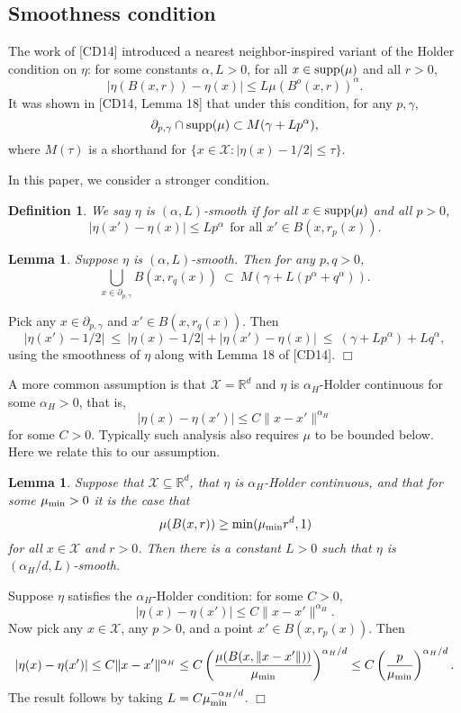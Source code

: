 \documentclass{article}
\def\R{{\mathbb{R}}}
\def\X{{\mathcal X}}
\def\supp{{\rm supp}}
\newtheorem{lemma}[thm]{Lemma}
\newtheorem{defn}[thm]{Definition}
\newenvironment{proof}{\noindent {\sc Proof:}}{$\Box$ \medskip}
\begin{document}
\subsection{Smoothness condition}

The work of [CD14] introduced a nearest neighbor-inspired variant of the Holder condition on $\eta$: for some constants $\alpha, L > 0$, for all $x \in \supp(\mu)$ and all $r > 0$,
$$ |\eta(B(x,r)) - \eta(x)| \leq L \mu(B^o(x,r))^\alpha .$$
It was shown in [CD14, Lemma 18] that under this condition, for any $p, \gamma$,
$$ \partial_{p,\gamma} \cap \supp(\mu) \subset M(\gamma + Lp^\alpha) ,$$
where $M(\tau)$ is a shorthand for $\{x \in \X: |\eta(x) - 1/2| \leq \tau\}$.

In this paper, we consider a stronger condition.
\begin{defn}
We say $\eta$ is $(\alpha, L)$-smooth if for all $x \in \supp(\mu)$ and all $p > 0$,
$$ |\eta(x') - \eta(x)| \leq L p^\alpha \ \ \mbox{for all $x' \in B(x,r_p(x))$}.$$
\end{defn}

\begin{lemma}
Suppose $\eta$ is $(\alpha, L)$-smooth. Then for any $p,q > 0$,
$$ \bigcup_{x \in \partial_{p, \gamma}} B(x, r_q(x)) \ \subset \ M(\gamma + L(p^\alpha + q^\alpha)).$$
\label{lemma:boundary-plus}
\end{lemma}
\begin{proof}
Pick any $x \in \partial_{p, \gamma}$ and $x' \in B(x,r_q(x))$. Then
$$
|\eta(x') - 1/2| 
\ \leq \ 
|\eta(x) - 1/2| + |\eta(x') - \eta(x)|
\ \leq \ 
(\gamma + Lp^\alpha) + Lq^\alpha,
$$
using the smoothness of $\eta$ along with Lemma 18 of [CD14].
\end{proof}

A more common assumption is that $\X = \R^d$ and $\eta$ is $\alpha_H$-Holder continuous for some $\alpha_H > 0$, that is,
$$ |\eta(x) - \eta(x')| \leq C \|x-x'\|^{\alpha_H}$$
for some $C > 0$. Typically such analysis also requires $\mu$ to be bounded below. Here we relate this to our assumption.
\begin{lemma}
Suppose that $\X \subseteq \R^d$, that $\eta$ is $\alpha_H$-Holder continuous, and that for some $\mu_{\scriptsize\rm min} > 0$ it is the case that 
$$\mu(B(x,r)) \geq \min(\mu_{\scriptsize\rm min} r^d,1)$$ 
for all $x \in \X$ and $r > 0$. Then there is a constant $L > 0$ such that $\eta$ is $(\alpha_H/d, L)$-smooth.
\end{lemma}
\begin{proof}
Suppose $\eta$ satisfies the $\alpha_H$-Holder condition: for some $C > 0$,
$$ |\eta(x) - \eta(x')| \leq C \|x-x'\|^{\alpha_H}.$$
Now pick any $x \in \X$, any $p > 0$, and a point $x' \in B(x, r_p(x))$. Then
$$ |\eta(x) - \eta(x')| 
\leq C \|x-x'\|^{\alpha_H}
\leq C \left( \frac{\mu(B(x, \|x-x'\|))}{\mu_{\scriptsize\rm min}} \right)^{\alpha_H/d}
\leq C \left( \frac{p}{\mu_{\scriptsize\rm min}} \right)^{\alpha_H/d}.
$$
The result follows by taking $L = C \mu_{\scriptsize\rm min}^{-\alpha_H/d}$.
\end{proof}
\end{document}

